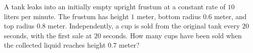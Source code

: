 A tank leaks into an initially empty upright frustum at a constant rate of $10$ liters per minute. The frustum has height $1$ meter, bottom radius $0.6$ meter, and top radius $0.8$ meter. Independently, a cup is sold from the original tank every $20$ seconds, with the first sale at $20$ seconds. How many cups have been sold when the collected liquid reaches height $0.7$ meter?
